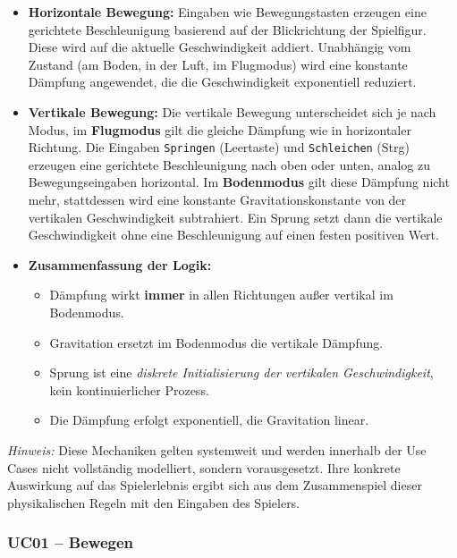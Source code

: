 \documentclass{article}
\begin{document}
\begin{itemize}
  \item \textbf{Horizontale Bewegung:}  Eingaben wie Bewegungstasten erzeugen eine gerichtete Beschleunigung basierend auf der Blickrichtung der Spielfigur. Diese wird auf die aktuelle Geschwindigkeit addiert. Unabhängig vom Zustand (am Boden, in der Luft, im Flugmodus) wird eine konstante Dämpfung angewendet, die die Geschwindigkeit exponentiell reduziert.

  \item \textbf{Vertikale Bewegung:}  Die vertikale Bewegung unterscheidet sich je nach Modus, im \textbf{Flugmodus} gilt die gleiche Dämpfung wie in horizontaler Richtung. Die Eingaben \texttt{Springen} (Leertaste) und \texttt{Schleichen} (Strg) erzeugen eine gerichtete Beschleunigung nach oben oder unten, analog zu Bewegungseingaben horizontal. Im \textbf{Bodenmodus} gilt diese Dämpfung nicht mehr, stattdessen wird eine konstante Gravitationskonstante von der vertikalen Geschwindigkeit subtrahiert. Ein Sprung setzt dann die vertikale Geschwindigkeit ohne eine Beschleunigung auf einen festen positiven Wert.

  \item \textbf{Zusammenfassung der Logik:}
  \begin{itemize}
    \item Dämpfung wirkt \textbf{immer} in allen Richtungen außer vertikal im Bodenmodus.
    \item Gravitation ersetzt im Bodenmodus die vertikale Dämpfung.
    \item Sprung ist eine \textit{diskrete Initialisierung der vertikalen Geschwindigkeit}, kein kontinuierlicher Prozess.
    \item Die Dämpfung erfolgt exponentiell, die Gravitation linear.
  \end{itemize}
\end{itemize}

\textit{Hinweis:} Diese Mechaniken gelten systemweit und werden innerhalb der Use Cases nicht vollständig modelliert, sondern vorausgesetzt. Ihre konkrete Auswirkung auf das Spielerlebnis ergibt sich aus dem Zusammenspiel dieser physikalischen Regeln mit den Eingaben des Spielers.

\newpage

\subsubsection*{UC01 – Bewegen}
\end{document}
